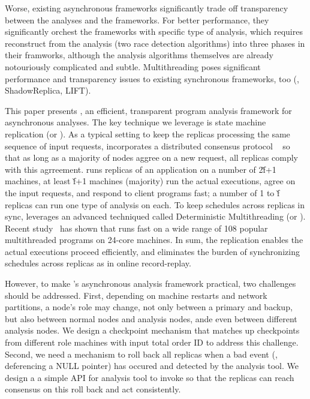 

Worse, existing asynchronous frameworks significantly trade off transparency 
between the analyses and the frameworks. For better performance, they 
significantly orchest the frameworks with specific type of analysis, which 
requires reconstruct from the analysis (two race detection algorithms) into 
three phases in their framworks, although the analysis algorithms themselves 
are already notouriously complicated and subtle. Multithreading poses 
significant performance and transparency issues to existing synchronous 
frameworks, too (\eg, ShadowReplica, LIFT).


This paper presents \xxx, an efficient, transparent program 
analysis framework for asynchronous analyses. The key technique we leverage is 
state machine replication (or \smr). As a typical \smr setting to keep the 
replicas processing the same sequence of input requests, \xxx incorporates a 
distributed consensus protocol \paxos~\cite{paxos} so that as long as a 
majority of nodes aggree on a new request, all replicas comply with this 
agrreement. \xxx runs replicas of an application on a number of 2\v{f}+1 
machines, at least \v{f}+1 machines (majority) run the actual executions, agree 
on the input requests, and respond to client programs fast; a number of 1 to 
\v{f} replicas can run one type of analysis on each. To keep 
schedules across replicas in sync, \repbox leverages an advanced techniqued 
called Deterministic Multithreading (or \dmt). Recent 
study~\cite{parrot:sosp13} has shown that \dmt runs fast on a wide range of 108 
popular multithreaded programs on 24-core machines. In sum, the \smr 
replication enables the actual executions proceed efficiently, and \dmt 
eliminates the burden of synchronizing schedules across replicas as in online
record-replay.


However, to make \xxx's asynchronous analysis framework practical, two 
challenges should be addressed. First, depending on machine restarts and 
network partitions, a node's role may change, not only between a \paxos primary 
and backup, but also between normal nodes and analysis nodes, ande even between 
different analysis nodes. We design a checkpoint mechanism that matches up 
checkpoints from different role machines with input total order ID to address 
this challenge. Second, we need a mechanism to roll back all replicas when a 
bad event (\eg, deferencing a NULL pointer) has occured and detected by the 
analysis tool. We design a a simple API for analysis tool to invoke so that the 
replicas can reach consensus on this roll back and act consistently.


